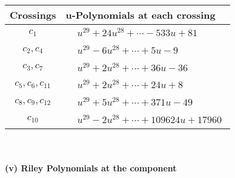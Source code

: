 \documentclass[1p]{elsarticle_modified}
\theoremstyle{definition}
\begin{document}
\begin{tabular}{m{50pt}|m{274pt}}
Crossings & \hspace{64pt}u-Polynomials at each crossing \\
\hline $$\begin{aligned}c_{1}\end{aligned}$$&$\begin{aligned}
&u^{29}+24 u^{28}+\cdots-533 u+81
\end{aligned}$\\
\hline $$\begin{aligned}c_{2},c_{4}\end{aligned}$$&$\begin{aligned}
&u^{29}-6 u^{28}+\cdots+5 u-9
\end{aligned}$\\
\hline $$\begin{aligned}c_{3},c_{7}\end{aligned}$$&$\begin{aligned}
&u^{29}+2 u^{28}+\cdots+36 u-36
\end{aligned}$\\
\hline $$\begin{aligned}c_{5},c_{6},c_{11}\end{aligned}$$&$\begin{aligned}
&u^{29}+2 u^{28}+\cdots+24 u+8
\end{aligned}$\\
\hline $$\begin{aligned}c_{8},c_{9},c_{12}\end{aligned}$$&$\begin{aligned}
&u^{29}+5 u^{28}+\cdots+371 u-49
\end{aligned}$\\
\hline $$\begin{aligned}c_{10}\end{aligned}$$&$\begin{aligned}
&u^{29}-2 u^{28}+\cdots+109624 u+17960
\end{aligned}$\\
\hline
\end{tabular}\\~\\
\newpage\renewcommand{\arraystretch}{1}
\flushleft \textbf{(v) Riley Polynomials at the component}\newline \\
\end{document}
